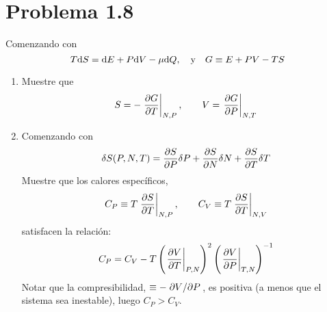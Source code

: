 \section{Problema 1.8}
\begin{tcolorbox}
\begin{problema}
	Comenzando con\begin{equation}
  T\dd S=\dd E+P\dd V-\mu\dd Q,\quad \text{y}\quad  G\equiv E+PV-TS
\end{equation}
\begin{enumerate}
	\item Muestre que
	\begin{equation}
  S=-\eval{\pdv{G}{T}}_{N,P},\qquad V=\eval{\pdv{G}{P}}_{N,T}
\end{equation}
\item Comenzando con
 \begin{equation}\label{18-dS}
  \delta S(P,N,T)=\pdv{S}{P}\delta P+\pdv{S}{N}\delta N+\pdv{S}{T}\delta T
\end{equation}
Muestre que los calores específicos,
\begin{equation}
  C_P\equiv T\eval{\pdv{S}{T}}_{N,P},\qquad C_V\equiv T\eval{\pdv{S}{T}}_{N,V}
\end{equation}
satisfacen la relación:
\begin{equation}
  C_P=C_V-T\left(\eval{\pdv{V}{T}}_{P,N}\right)^2\left(\eval{\pdv{V}{P}}_{T,N}\right)^{-1}
\end{equation}
Notar que la compresibilidad, $\equiv -\pdv*{V}{P}$, es positiva (a menos que el sistema sea inestable), luego $C_P>C_V$.
\end{enumerate}
\end{problema}
\end{tcolorbox}

